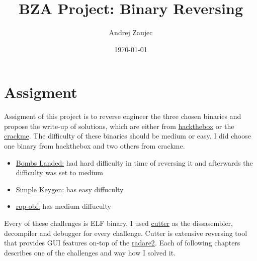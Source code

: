 \documentclass[11pt]{article}
\author{Andrej Zaujec}
\date{\today}
\title{BZA Project: Binary Reversing}
\begin{document}
\maketitle
\tableofcontents


\section{Assigment}
\label{sec:orgdbb6f34}
Assigment of this project is to reverse engineer the three chosen binaries and propose the write-up of solutions, which are either from \href{https://hackthebox.com}{hackthebox} or the \href{https://crackmes.one/}{crackme}. The difficulty of these binaries should be medium or easy.
I did choose one binary from hackthebox and two others from crackme.
\begin{itemize}
\item \href{https://app.hackthebox.com/challenges/bombs-landed}{Bombs Landed:} had hard difficulty in time of reversing it and afterwards the difficulty was set to medium
\item \href{https://crackmes.one/crackme/5c2acb8933c5d46a3882b8d4}{Simple Keygen:} has easy diffuculty
\item \href{https://crackmes.one/crackme/5cfb961a33c5d41c6d56e069}{rop-obf:} has medium diffuculty
\end{itemize}
Every of these challenges is ELF binary, I used \href{https://cutter.re/}{cutter} as the dissasembler, decompiler and debugger for every challenge. Cutter is extensive reversing tool that provides GUI features on-top of the \href{https://rada.re/n/radare2.html}{radare2}.
Each of following chapters describes one of the challenges and way how I solved it.
\end{document}
